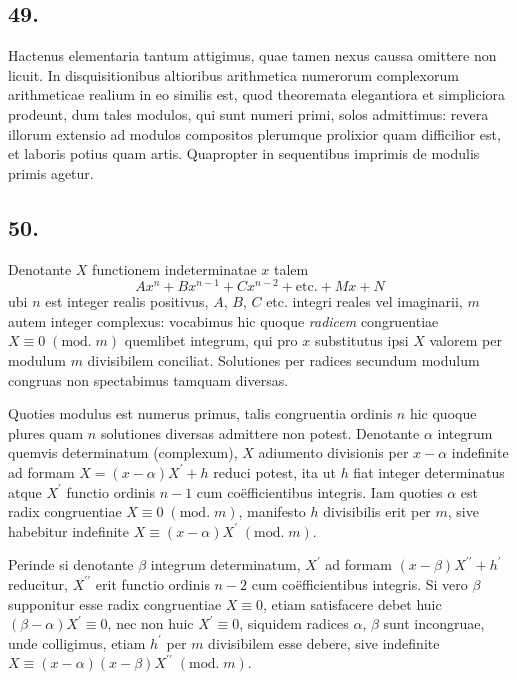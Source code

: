 \documentclass[twoside,12pt]{memoir}
\renewcommand{\pmod}[1]{\;(\textrm{mod.}\;#1)}
\begin{document}
\subsection*{49.}
 
Hactenus elementaria tantum attigimus, quae tamen nexus caussa omittere non licuit. In disquisitionibus altioribus arithmetica numerorum complexorum arithmeticae realium in eo similis est, quod theoremata elegantiora et simpliciora prodeunt, dum tales modulos, qui sunt numeri primi, solos admittimus: revera illorum extensio ad modulos compositos plerumque prolixior quam difficilior est, et laboris potius quam artis. Quapropter in sequentibus imprimis de modulis primis agetur.

\subsection*{50.}
 
Denotante \({X}\) functionem indeterminatae \(x\) talem
\[A x^{n}+B x^{n-1}+C x^{n-2}+\text{etc.}+M x+N\]\pagebreak%
ubi \(n\) est integer realis positivus, \(A\), \(B\), \(C\) etc. integri reales vel imaginarii, \(m\) autem integer complexus: vocabimus hic quoque \textit{radicem} congruentiae \(X \equiv 0\pmod{m}\) quemlibet integrum, qui pro \(x\) substitutus ipsi \(X\) valorem per modulum \(m\) divisibilem conciliat. Solutiones per radices secundum modulum congruas non spectabimus tamquam diversas.
 
Quoties modulus est numerus primus, talis congruentia ordinis \(n\) hic quoque plures quam \(n\) solutiones diversas admittere non potest. Denotante \(\alpha\) integrum quemvis determinatum (complexum), \(X\) adiumento divisionis per \(x-\alpha\) indefinite ad formam \(X=(x-\alpha) X^{\prime}+h\) reduci potest, ita ut \(h\) fiat integer determinatus atque \(X^{\prime}\) functio ordinis \(n-1\) cum coëfficientibus integris. Iam quoties \(\alpha\) est radix congruentiae \(X \equiv 0\pmod{m}\), manifesto \(h\) divisibilis erit per \(m\), sive habebitur indefinite \(X \equiv(x-\alpha) X^{\prime}\pmod{m}\).

Perinde si denotante \(\beta\) integrum determinatum, \(X^{\prime}\) ad formam \((x-\beta) X^{\prime \prime}+h^{\prime}\) reducitur, \(X^{\prime \prime}\) erit functio ordinis \(n-2\) cum coëfficientibus integris. Si vero \(\beta\) supponitur esse radix congruentiae \({X} \equiv 0\), etiam satisfacere debet huic \((\beta-\alpha) X^{\prime} \equiv 0\), nec non huic \(X^{\prime} \equiv 0\), siquidem radices \(\alpha\), \(\beta\) sunt incongruae, unde colligimus, etiam \(h^{\prime}\) per \(m\) divisibilem esse debere, sive indefinite \(X \equiv(x-\alpha)(x-\beta) X^{\prime \prime}\pmod{m}\).
 
\end{document}
